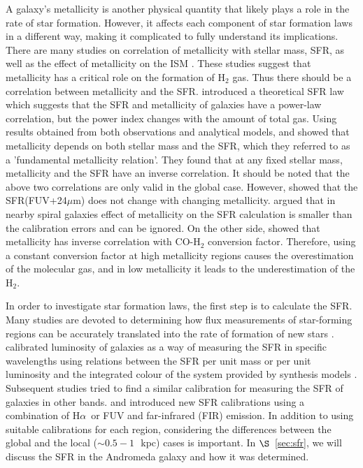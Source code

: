 \documentclass[useAMS,usenatbib]{mn2e}
\newcommand \kpc        {\,{\rm kpc}}
\newcommand \halpha    {H$\alpha $\ }
\begin{document}
A galaxy's metallicity is another physical quantity that likely plays a role in the rate of star formation. However, it affects each component of star formation laws in a different way, making it complicated to fully understand its implications. There are many studies on correlation of metallicity with stellar mass, SFR, as well as the effect of metallicity on the ISM \citep[e.g.][]{Boissier03, Leroy08, Krumholz09, Mannucci10, Dib11a, Lilly13}. These studies suggest that metallicity has a critical role on the formation of H$_2$ gas. Thus there should be a correlation between metallicity and the SFR. \cite{Krumholz09} introduced a theoretical SFR law which suggests that the SFR and metallicity of galaxies have a power-law correlation, but the power index changes with the amount of total gas. %
 Using results obtained from both observations and analytical models, \cite{Mannucci10} and \cite{Lilly13} showed that metallicity depends on both stellar mass and the SFR, which they referred to as a 'fundamental metallicity relation'. They found that at any fixed stellar mass, metallicity and the SFR have an inverse correlation. It should be noted that the above two correlations are only valid in the global case. However, \cite{Leroy08} showed that the SFR(FUV+24$\mu$m) does not change with changing metallicity. \cite{Roychowdhury15} argued that in nearby spiral galaxies effect of metallicity on the SFR calculation is smaller than the calibration errors and can be ignored. On the other side, \cite{Boissier03} showed that metallicity has inverse correlation with CO-H$_2$ conversion factor. Therefore, using a constant conversion factor at high metallicity regions causes the overestimation of the molecular gas, and in low metallicity it leads to the underestimation of the H$_2$. 


In order to investigate star formation laws, the first step is to calculate the SFR. Many studies are devoted to determining how flux measurements of star-forming regions can be accurately translated into the rate of formation of new stars \citep[e.g.][]{Kennicutt12, Calzetti13, Zhu08, Kennicutt09, Boquien10, Boquien11, Hao11}. \cite{Kennicutt98b} calibrated luminosity of galaxies as a way of measuring the SFR in specific wavelengths using relations between the SFR per unit mass or per unit luminosity and the integrated colour of the system provided by synthesis models \citep[e.g.][]{Bruzual93}. Subsequent studies tried to find a similar calibration for measuring the SFR of galaxies in other bands. \cite{Kennicutt09} and \cite{Hao11} introduced new SFR calibrations using a combination of \halpha or FUV and far-infrared (FIR) emission. In addition to using suitable calibrations for each region, considering the differences between the global and the local ($\sim 0.5-1$~\kpc) cases is important. In $\S$~\ref{sec:sfr}, we will discuss the SFR in the Andromeda galaxy and how it was determined. %
\end{document}
